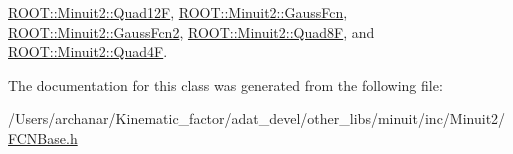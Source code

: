 \mbox{\hyperlink{classROOT_1_1Minuit2_1_1Quad12F_afbb216349fbceafc530845fe1cff5af4}{R\+O\+O\+T\+::\+Minuit2\+::\+Quad12F}}, \mbox{\hyperlink{classROOT_1_1Minuit2_1_1GaussFcn_a7e73468f853c287df3b5da240c3b5bb5}{R\+O\+O\+T\+::\+Minuit2\+::\+Gauss\+Fcn}}, \mbox{\hyperlink{classROOT_1_1Minuit2_1_1GaussFcn2_aef7172f9af50244bc9fce0c96cc21e81}{R\+O\+O\+T\+::\+Minuit2\+::\+Gauss\+Fcn2}}, \mbox{\hyperlink{classROOT_1_1Minuit2_1_1Quad8F_a8f241ff1340ea2184c7ee9247b8b200a}{R\+O\+O\+T\+::\+Minuit2\+::\+Quad8F}}, and \mbox{\hyperlink{classROOT_1_1Minuit2_1_1Quad4F_a19ebb5413722895a7635626cca02ebe9}{R\+O\+O\+T\+::\+Minuit2\+::\+Quad4F}}.



The documentation for this class was generated from the following file\+:\begin{DoxyCompactItemize}
\item 
/\+Users/archanar/\+Kinematic\+\_\+factor/adat\+\_\+devel/other\+\_\+libs/minuit/inc/\+Minuit2/\mbox{\hyperlink{other__libs_2minuit_2inc_2Minuit2_2FCNBase_8h}{F\+C\+N\+Base.\+h}}\end{DoxyCompactItemize}
